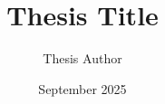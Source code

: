 \documentclass[12pt, eng, master]{thesis}
\title{Thesis Title}{제목}
\author{Thesis Author}{작가}
\date{September 2025}{2025년 9월}
\begin{document}
\makecover
\setbodylayout
\frontmatter

\tableofcontents \clearpage
\listoffigures \clearpage
\listoftables \clearpage

\mainmatter



\backmatter
\makebibliography
\makeabstract
\end{document}
